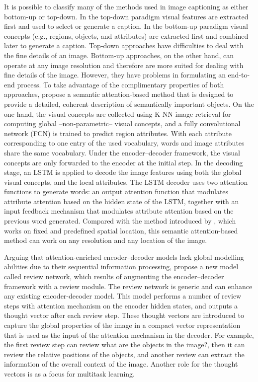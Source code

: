 It is possible to classify many of the methods used in image captioning as either bottom-up or top-down. In the top-down paradigm \citep{Donahue2015, Karpathy2015, Chen2015, Mao2015_mRNN, Mao2015_Child, Vinyals2015,Xu2015} visual features are extracted first and used to select or generate a caption. In the bottom-up paradigm \citep{Farhadi2010, Kulkarni2011, Li2011, Kuznetsova2012, Elliott2013, Lebret2015a} visual concepts (e.g., regions, objects, and attributes) are extracted first and combined later to generate a caption. Top-down approaches have difficulties to deal with the fine details of an image. Bottom-up approaches, on the other hand, can operate at any image resolution and therefore are more suited for dealing with  fine details of the image. However, they have problems in formulating an end-to-end process. To take advantage of the complimentary properties of both approaches, \citet{You2016} propose a semantic attention-based method that is designed to provide a detailed, coherent description of semantically important objects. On the one hand, the visual concepts are collected using K-NN image retrieval for computing global --non-parametric-- visual concepts, and a fully convolutional network (FCN) \citep{Long2015} is trained to predict region attributes. With each attribute corresponding to one entry of the used vocabulary, words and image attributes share the same vocabulary. Under the encoder–decoder framework, the visual concepts are only forwarded to the encoder at the initial step. In the decoding stage, an LSTM is applied to decode the image features using both the global visual concepts, and the local attributes. The LSTM decoder uses two attention functions to generate words: an output attention function that modulates attribute attention based on the hidden state of the LSTM, together with an input feedback mechanism that modulates attribute attention based on the previous word generated. Compared with the method introduced by \citet{Xu2015}, which works on fixed and predefined spatial location, this semantic attention-based method can work on any resolution and any location of the image.

Arguing that attention-enriched encoder–decoder models lack global modelling abilities due to their sequential information processing, \citet{Yang2016_RevNet} propose a new model called review network, which results of augmenting the encoder–decoder framework with a review module. The review network is generic and can enhance any existing encoder-decoder model.
This model performs a number of review steps with attention mechanism on the encoder hidden states, and outputs a thought vector after each review step. These thought vectors are introduced to capture the global properties of the image in a compact vector representation that is used as the input of the attention mechanism in the decoder. For example, the first review step can review what are the objects in the image?, then it can review the relative positions of the objects, and another review can extract the information of the overall context of the image. Another role for the thought vectors is as a focus for multitask learning.

